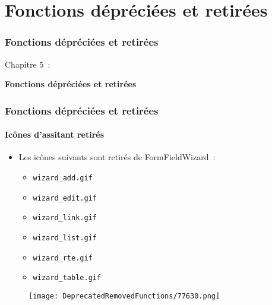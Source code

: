 %

\section{Fonctions dépréciées et retirées}
\begin{frame}[fragile]
	\frametitle{Fonctions dépréciées et retirées}

	\begin{center}\huge{Chapitre 5~:}\end{center}
	\begin{center}\huge{\color{typo3darkgrey}\textbf{Fonctions dépréciées et retirées}}\end{center}

\end{frame}

\begin{frame}[fragile]
	\frametitle{Fonctions dépréciées et retirées}
	\framesubtitle{Icônes d'assitant retirés}

	\begin{itemize}

		\item Les icônes suivants sont retirés de FormFieldWizard~:

			\begin{itemize}
				\item \texttt{wizard\_add.gif}
				\item \texttt{wizard\_edit.gif}
				\item \texttt{wizard\_link.gif}
				\item \texttt{wizard\_list.gif}
				\item \texttt{wizard\_rte.gif}
				\item \texttt{wizard\_table.gif}
			\end{itemize}

	\end{itemize}

	\begin{figure}
		\texttt{[image: DeprecatedRemovedFunctions/77630.png]}
	\end{figure}

\end{frame}

